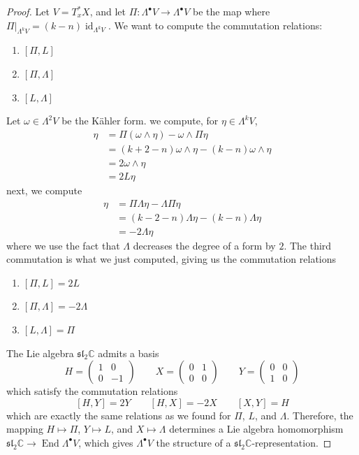 \documentclass[psamsfonts, 12pt]{amsart}
\theoremstyle{definition}
\theoremstyle{remark}
\renewcommand{\sl}{\mathfrak{sl}}
\newcommand{\C}{\mathbb{C}}
\DeclareMathOperator{\id}{id}
\DeclareMathOperator{\End}{End}
\begin{document}
\begin{proof}
Let $V = T^*_xX$, and let $\Pi : \Lambda^\bullet V \to \Lambda^\bullet V$ be the map
where $\Pi\vert_{\Lambda^kV} = (k-n)\id_{\Lambda^kV}$. We want to compute the
commutation relations:
\begin{enumerate}
  \item $[\Pi,L]$
  \item $[\Pi,\Lambda]$
  \item $[L,\Lambda]$
\end{enumerate}
Let $\omega \in \Lambda^2V$ be the K\"ahler form. we compute, for
$\eta \in \Lambda^kV$,
\begin{align*}
[\Pi, L]\eta &= \Pi(\omega \wedge \eta) - \omega \wedge \Pi\eta \\
&= (k+2-n)\omega\wedge\eta - (k-n)\omega\wedge\eta \\
&= 2\omega\wedge \eta \\
&= 2L\eta
\end{align*}
next, we compute
\begin{align*}
[\Pi, \Lambda]\eta &= \Pi\Lambda\eta - \Lambda\Pi\eta \\
&= (k-2-n)\Lambda\eta - (k-n)\Lambda\eta \\
&= -2\Lambda\eta
\end{align*}
where we use the fact that $\Lambda$ decreases the degree of a form by $2$. The third
commutation is what we just computed, giving us the commutation relations
\begin{enumerate}
  \item $[\Pi, L] = 2L$
  \item $[\Pi,\Lambda] = -2\Lambda$
  \item $[L,\Lambda] = \Pi$
\end{enumerate}
The Lie algebra $\sl_2\C$ admits a basis
\[
H = \begin{pmatrix}
1 & 0 \\
0 & -1
\end{pmatrix} \qquad X = \begin{pmatrix}
0 & 1 \\
0 & 0
\end{pmatrix} \qquad Y = \begin{pmatrix}
0 & 0 \\
1 & 0
\end{pmatrix}
\]
which satisfy the commutation relations
\[
[H,Y] = 2Y \qquad [H,X] = -2X \qquad [X,Y] = H
\]
which are exactly the same relations as we found for $\Pi$, $L$, and $\Lambda$.
Therefore, the mapping $H \mapsto \Pi$, $Y \mapsto L$, and $X \mapsto \Lambda$
determines a Lie algebra homomorphism $\sl_2\C \to \End\Lambda^\bullet V$, which gives
$\Lambda^\bullet V$ the structure of a $\sl_2\C$-representation.
\end{proof}
\end{document}

